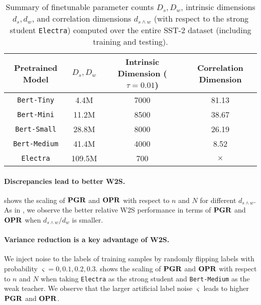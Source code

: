 \begin{table}[!ht]
    \centering
    \caption{Summary of finetunable parameter counts $D_s, D_w$, intrinsic dimensions $d_s, d_w$, and correlation dimensions $d_{s \wedge w}$ (with respect to the strong student \texttt{Electra}) computed over the entire SST-2 dataset (including training and testing).}\label{tab:sst2_dim}
    \begin{tabular}{c|ccc}
        \toprule
        Pretrained Model & $D_s,D_w$ & Intrinsic Dimension ($\tau=0.01$) & Correlation Dimension \\
        \midrule
        \texttt{Bert-Tiny} & 4.4M & 7000 & 81.13 \\
        \texttt{Bert-Mini} & 11.2M & 8500 & 38.67 \\
        \texttt{Bert-Small} & 28.8M & 8000 & 26.19 \\
        \texttt{Bert-Medium} & 41.4M & 4000 & 8.52 \\
        \midrule
        \texttt{Electra} & 109.5M & 700 & $\times$ \\
        \bottomrule
    \end{tabular}
\end{table}

\paragraph{Discrepancies lead to better W2S.}
 shows the scaling of $\mathbf{PGR}$ and $\mathbf{OPR}$ with respect to $n$ and $N$ for different $d_{s \wedge w}$. 
As in , we observe the better relative W2S performance in terms of $\mathbf{PGR}$ and $\mathbf{OPR}$ when $d_{s \wedge w}/d_w$ is smaller.

\paragraph{Variance reduction is a key advantage of W2S.}
We inject noise to the labels of training samples by randomly flipping labels with probability $\varsigma = 0, 0.1, 0.2, 0.3$. 
 shows the scaling of $\mathbf{PGR}$ and $\mathbf{OPR}$ with respect to $n$ and $N$ when taking \texttt{Electra} as the strong student and \texttt{Bert-Medium} as the weak teacher. We observe that the larger artificial label noise $\varsigma$ leads to higher $\mathbf{PGR}$ and $\mathbf{OPR}$. 